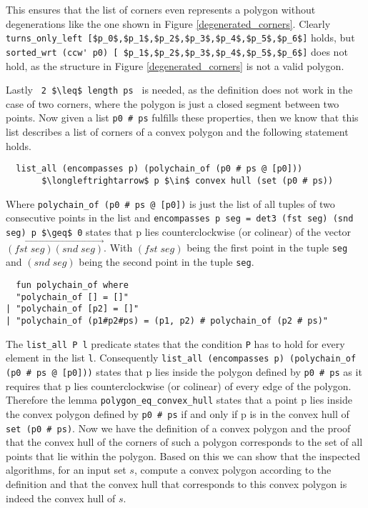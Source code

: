This ensures that the list of corners even represents a polygon
without degenerations like the one shown in Figure \ref{degenerated_corners}. Clearly 
\lstinline|turns_only_left [$p_0$,$p_1$,$p_2$,$p_3$,$p_4$,$p_5$,$p_6$]| holds,
but \lstinline|sorted_wrt (ccw' p0) [ $p_1$,$p_2$,$p_3$,$p_4$,$p_5$,$p_6$]| does not
hold, as the structure in Figure \ref{degenerated_corners} is not a valid polygon.
\begin{center}
  \begin{minipage}{0.5\textwidth}
  \centering
  
  \label{degenerated_corners}
\end{minipage}
\end{center}
Lastly \lstinline| 2 $\leq$ length ps | is needed, as the definition does not work in the case 
of two corners, where the polygon is just a closed segment between two points.
Now given a list \lstinline|p0 # ps| fulfills these properties, then we know that this list
describes a list of corners of a convex polygon and the following statement holds.
\begin{lstlisting}
  list_all (encompasses p) (polychain_of (p0 # ps @ [p0]))
       $\longleftrightarrow$ p $\in$ convex hull (set (p0 # ps))
\end{lstlisting}  
Where \lstinline|polychain_of (p0 # ps @ [p0])| is just the list of all tuples of two 
consecutive points in the list and 
\lstinline|encompasses p seg = det3 (fst seg) (snd seg) p $\geq$ 0| states that p lies
counterclockwise (or colinear)  of the vector  $\overrightarrow{(fst \; seg) (snd \; seg)}$. 
With $(fst \; seg)$ being the first point in the tuple  
\lstinline|seg| and $(snd \; seg)$ being the second point in the tuple \lstinline|seg|.
\begin{lstlisting}
  fun polychain_of where
  "polychain_of [] = []"
| "polychain_of [p2] = []"
| "polychain_of (p1#p2#ps) = (p1, p2) # polychain_of (p2 # ps)"
\end{lstlisting}  
The \lstinline|list_all P l| predicate states that the condition \lstinline|P| has to hold
for every element in the list \lstinline|l|.
Consequently \lstinline|list_all (encompasses p) (polychain_of (p0 # ps @ [p0]))| states that p lies
inside the polygon defined by \lstinline|p0 # ps| as it requires that p lies counterclockwise (or colinear) 
of every edge of the polygon. Therefore the lemma \lstinline|polygon_eq_convex_hull| states that a point p
lies inside the convex polygon defined by \lstinline|p0 # ps| if and only if p is in the convex hull
of \lstinline|set (p0 # ps)|. Now we have the definition of a convex polygon and the proof that
the convex hull of the corners of such a 
polygon corresponds to the set of all points that lie within the polygon. Based on this we can show 
that the inspected algorithms, for an input set $s$, compute a convex polygon according to the definition  
and that the convex hull that corresponds to this convex polygon is indeed the convex hull of $s$.




